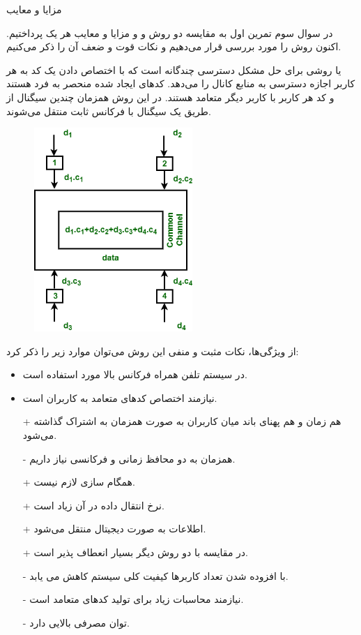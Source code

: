 \SubProblem
{مزایا و معایب }
{
در سوال سوم تمرین اول به مقایسه دو روش
و
و مزایا و معایب هر یک پرداختیم.
اکنون روش
را مورد بررسی قرار می‌دهیم و نکات قوت و ضعف آن را ذکر می‌کنیم.

یا
روشی برای حل مشکل دسترسی چندگانه است که با اختصاص دادن یک کد به هر کاربر اجازه دسترسی به منابع کانال را می‌دهد.
کدهای ایجاد شده منحصر به فرد هستند و کد هر کاربر با کاربر دیگر متعامد هستند.
در این روش همزمان چندین سیگنال از طریق یک سیگنال با فرکانس ثابت منتقل می‌شوند.

\begin{figure}[H]
    \includegraphics[width=6cm]{Images/CDMA.png}
    \centering
    \caption{}
\end{figure}

از ویژگی‌ها، نکات مثبت و منفی این روش می‌توان موارد زیر را ذکر کرد:

\begin{itemize}
    \item
    در سیستم تلفن همراه فرکانس بالا مورد استفاده است.
    
    \item
    نیازمند اختصاص کدهای متعامد به کاربران است.
    
    \item[+]
    هم زمان و هم پهنای باند میان کاربران به صورت همزمان به اشتراک گذاشته می‌شود.
    
    \item[-]
    همزمان به دو محافظ زمانی و فرکانسی نیاز داریم.
    
    \item[+]
    همگام سازی لازم نیست.
    
    \item[+]
    نرخ انتقال داده در آن زیاد است.
    
    \item[+]
    اطلاعات به صورت دیجیتال منتقل می‌شود.
    
    \item[+]
    در مقایسه با دو روش دیگر بسیار انعطاف پذیر است.
    
    \item[-]
    با افزوده شدن تعداد کاربرها کیفیت کلی سیستم کاهش می یابد.
    
    \item[-]
    نیازمند محاسبات زیاد برای تولید کدهای متعامد است.
    
    \item[-]
    توان مصرفی بالایی دارد.
\end{itemize}
}
